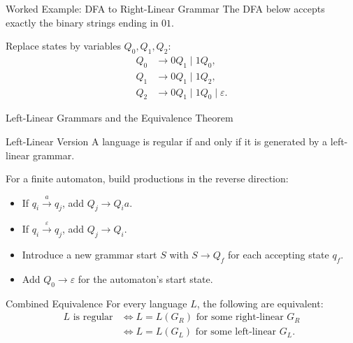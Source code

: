 \documentclass[10pt]{beamer}
\begin{document}
\begin{frame}{Worked Example: DFA to Right-Linear Grammar}
  \small
  The DFA below accepts exactly the binary strings ending in $01$.
  \begin{center}
  \end{center}
  \pause
  Replace states by variables $Q_0,Q_1,Q_2$:
  \[
    \begin{aligned}
      Q_0&\rightarrow 0Q_1\mid 1Q_0,\\
      Q_1&\rightarrow 0Q_1\mid 1Q_2,\\
      Q_2&\rightarrow 0Q_1\mid 1Q_0\mid\varepsilon.
    \end{aligned}
  \]
\end{frame}

\begin{frame}{Left-Linear Grammars and the Equivalence Theorem}
  \small
  \begin{block}{Left-Linear Version}
    A language is regular if and only if it is generated by a left-linear grammar.
  \end{block}
  \pause
  For a finite automaton, build productions in the reverse direction:
  \begin{itemize}
    \item If $q_i\xrightarrow{a}q_j$, add $Q_j\rightarrow Q_i a$.
    \item If $q_i\xrightarrow{\varepsilon}q_j$, add $Q_j\rightarrow Q_i$.
    \item Introduce a new grammar start $S$ with $S\rightarrow Q_f$ for each
      accepting state $q_f$.
    \item Add $Q_0\rightarrow\varepsilon$ for the automaton's start state.
  \end{itemize}
  \pause
  \begin{block}{Combined Equivalence}
    For every language $L$, the following are equivalent:
    \begin{align*}
      L\text{ is regular}
      &\Longleftrightarrow L=L(G_R)\text{ for some right-linear }G_R\\
      &\Longleftrightarrow L=L(G_L)\text{ for some left-linear }G_L.
    \end{align*}
  \end{block}
\end{frame}
\end{document}
